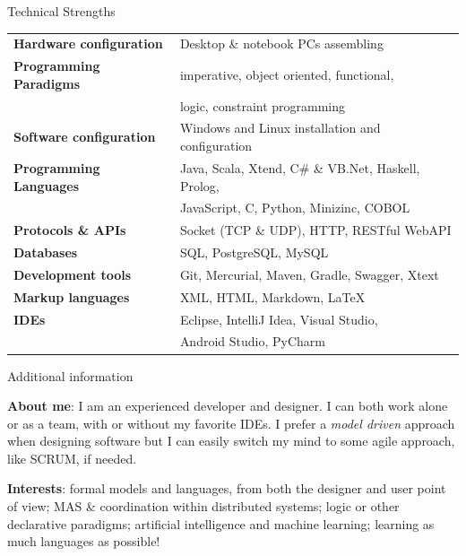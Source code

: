 \documentclass{resume} %
\begin{document}

\begin{rSection}{Technical Strengths}
\begin{tabular}{ @{} >{\bfseries}l @{\hspace{6ex}} l }
Hardware configuration 	& Desktop \& notebook PCs assembling \\
Programming Paradigms	& imperative, object oriented, functional,\\
						& logic, constraint programming\\
Software configuration 	& Windows and Linux installation and configuration\\
Programming Languages 	& Java, Scala, Xtend, C\# \& VB.Net, Haskell, Prolog,\\
						& JavaScript, C, Python, Minizinc, COBOL\\
Protocols \& APIs 		& Socket (TCP \& UDP), HTTP, RESTful WebAPI \\
Databases 				& SQL, PostgreSQL, MySQL\\
Development tools 		& Git, Mercurial, Maven, Gradle, Swagger, Xtext\\
Markup languages 		& XML, HTML, Markdown, \LaTeX \\
IDEs 					& Eclipse, IntelliJ Idea, Visual Studio, \\
						& Android Studio, PyCharm
\end{tabular}						
\end{rSection}


\begin{rSection}{Additional information}

\item \textbf{About me}: I am an experienced developer and designer. 
I can both work alone or as a team, with or without my favorite IDEs. 
I prefer a \emph{model driven} approach when designing software but I can easily switch my mind to some agile approach, like SCRUM, if needed.

\item \textbf{Interests}: formal models and languages, from both the designer and user point of view; MAS \& coordination within distributed systems; logic or other declarative paradigms; artificial intelligence and machine learning; learning as much languages as possible!
\end{rSection}
\end{document}

